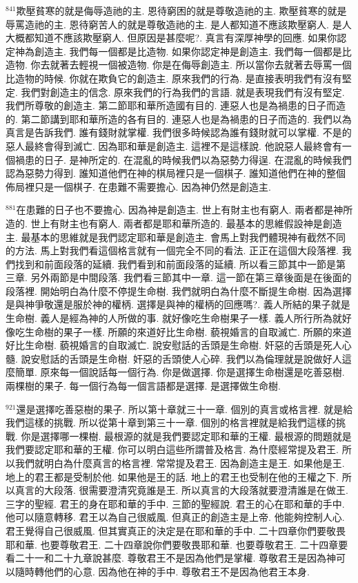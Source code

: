 \documentclass{book}
\begin{document}
$^{841}$欺壓貧寒的就是侮辱造祂的主.
恩待窮困的就是尊敬造祂的主.
欺壓貧寒的就是辱罵造祂的主.
恩待窮苦人的就是尊敬造祂的主.
是人都知道不應該欺壓窮人.
是人大概都知道不應該欺壓窮人.
但原因是甚麼呢?.
真言有深厚神學的回應.
如果你認定神為創造主.
我們每一個都是比造物.
如果你認定神是創造主.
我們每一個都是比造物.
你去就著去輕視一個被造物.
你是在侮辱創造主.
所以當你去就著去辱罵一個比造物的時候.
你就在欺負它的創造主.
原來我們的行為.
是直接表明我們有沒有堅定.
我們對創造主的信念.
原來我們的行為我們的言語.
就是表現我們有沒有堅定.
我們所尊敬的創造主.
第二節耶和華所造國有目的.
連惡人也是為禍患的日子而造的.
第二節講到耶和華所造的各有目的.
連惡人也是為禍患的日子而造的.
我們以為真言是告訴我們.
誰有錢財就掌權.
我們很多時候認為誰有錢財就可以掌權.
不是的 惡人最終會得到滅亡.
因為耶和華是創造主.
這裡不是這樣說.
他說惡人最終會有一個禍患的日子.
是神所定的.
在混亂的時候我們以為惡勢力得逞.
在混亂的時候我們認為惡勢力得到.
誰知道他們在神的棋局裡只是一個棋子.
誰知道他們在神的整個佈局裡只是一個棋子.
在患難不需要擔心.
因為神仍然是創造主.

$^{881}$在患難的日子也不要擔心.
因為神是創造主.
世上有財主也有窮人.
兩者都是神所造的.
世上有財主也有窮人.
兩者都是耶和華所造的.
最基本的思維假設神是創造主.
最基本的思維就是我們認定耶和華是創造主.
會馬上對我們體現神有截然不同的方法.
馬上對我們看這個格言就有一個完全不同的看法.
正正在這個大段落裡.
我們找到和前面段落的延續.
我們看到和前面段落的延續.
所以看三節其中一節是第三章.
另外兩節是中間段落.
我們看三節其中一章.
這一節在第三章後面是在後面的段落裡.
開始明白為什麼不停提生命樹.
我們就明白為什麼不斷提生命樹.
因為選擇是與神爭敬還是服於神的權柄.
選擇是與神的權柄的回應嗎?.
義人所結的果子就是生命樹.
義人是經為神的人所做的事.
就好像吃生命樹果子一樣.
義人所行所為就好像吃生命樹的果子一樣.
所願的來道好比生命樹.
藐視婚言的自取滅亡.
所願的來道好比生命樹.
藐視婚言的自取滅亡.
說安慰話的舌頭是生命樹.
奸惡的舌頭是死人心髓.
說安慰話的舌頭是生命樹.
奸惡的舌頭使人心碎.
我們以為倫理就是說做好人這麼簡單.
原來每一個說話每一個行為.
你是做選擇.
你是選擇生命樹還是吃善惡樹.
兩棵樹的果子.
每一個行為每一個言語都是選擇.
是選擇做生命樹.

$^{921}$還是選擇吃善惡樹的果子.
所以第十章就三十一章.
個別的真言或格言裡.
就是給我們這樣的挑戰.
所以從第十章到第三十一章.
個別的格言裡就是給我們這樣的挑戰.
你是選擇哪一棵樹.
最根源的就是我們要認定耶和華的王權.
最根源的問題就是我們要認定耶和華的王權.
你可以明白這些所謂普及格言.
為什麼經常提及君王.
所以我們就明白為什麼真言的格言裡.
常常提及君王.
因為創造主是王.
如果他是王.
地上的君王都是受制於他.
如果他是王的話.
地上的君王也受制在他的王權之下.
所以真言的大段落.
很需要澄清究竟誰是王.
所以真言的大段落就要澄清誰是在做王.
三字的聖經.
君王的身在耶和華的手中.
三節的聖經說.
君王的心在耶和華的手中.
他可以隨意轉移.
君王以為自己很威風.
但真正的創造主是上帝.
他能夠控制人心.
君王覺得自己很威風.
但其實真正的決定是在耶和華的手中.
二十四章你們要敬畏耶和華.
也要尊敬君王.
二十四章說你們要敬畏耶和華.
也要尊敬君王.
二十四章要看二十一和二十九章說甚麼.
尊敬君王不是因為他們是掌權.
尊敬君王是因為神可以隨時轉他們的心意.
因為他在神的手中.
尊敬君王不是因為他君王本身.
\end{document}

